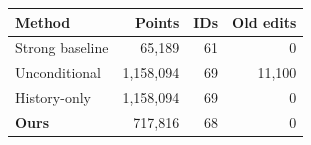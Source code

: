 \begin{tabular}{lrrr}
\toprule
Method & Points & IDs & Old edits \\
\midrule
Strong baseline & 65,189 & 61 & 0 \\
Unconditional & 1,158,094 & 69 & 11,100 \\
History-only & 1,158,094 & 69 & 0 \\
\textbf{Ours} & 717,816 & 68 & 0 \\
\bottomrule
\end{tabular}
